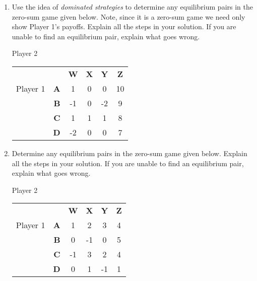 





\begin{enumerate}
\item Use the idea of {\it dominated strategies} to determine any equilibrium pairs in the zero-sum game given below. Note, since it is a zero-sum game we need only show Player 1's payoffs. Explain all the steps in your solution. If you are unable to find an equilibrium pair, explain what goes wrong.
\vspace{.1in}

\hspace{1in}Player 2

\begin{tabular}{l|r|c|c|c|c|}\cline{2-6}
&&\textbf{W}&\textbf{X}&\textbf{Y}&\textbf{Z}\\ \cline{2-6}
Player 1&\textbf{A} &1&0&0&10\\ \cline{2-6}
&\textbf{B} &-1&0&-2&9\\ \cline{2-6}
&\textbf{C} &1&1&1&8\\ \cline{2-6}
&\textbf{D} &-2&0&0&7\\ \cline{2-6}
\end{tabular}
\vspace{.2in}

\item Determine any equilibrium pairs in the zero-sum game given below.  Explain all the steps in your solution. If you are unable to find an equilibrium pair, explain what goes wrong.

\vspace{.1in}

\hspace{1in}Player 2

\begin{tabular}{l|r|c|c|c|c|}\cline{2-6}
&&\textbf{W}&\textbf{X}&\textbf{Y}&\textbf{Z}\\ \cline{2-6}
Player 1&\textbf{A} &1&2&3&4\\ \cline{2-6}
&\textbf{B} &0&-1&0&5\\ \cline{2-6}
&\textbf{C} &-1&3&2&4\\ \cline{2-6}
&\textbf{D} &0&1&-1&1\\ \cline{2-6}
\end{tabular}
\vspace{.2in}


\end{enumerate}

